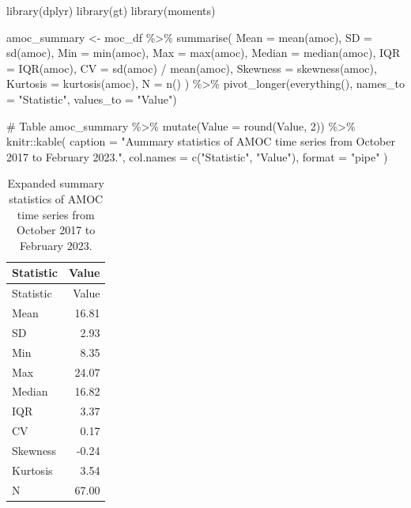 \documentclass[
  11pt,
]{article}
\newenvironment{Shaded}{\begin{snugshade}}{\end{snugshade}}
\newcommand{\AttributeTok}[1]{\textcolor[rgb]{0.40,0.45,0.13}{#1}}
\newcommand{\CommentTok}[1]{\textcolor[rgb]{0.37,0.37,0.37}{#1}}
\newcommand{\DecValTok}[1]{\textcolor[rgb]{0.68,0.00,0.00}{#1}}
\newcommand{\FunctionTok}[1]{\textcolor[rgb]{0.28,0.35,0.67}{#1}}
\newcommand{\NormalTok}[1]{\textcolor[rgb]{0.00,0.23,0.31}{#1}}
\newcommand{\OtherTok}[1]{\textcolor[rgb]{0.00,0.23,0.31}{#1}}
\newcommand{\SpecialCharTok}[1]{\textcolor[rgb]{0.37,0.37,0.37}{#1}}
\newcommand{\StringTok}[1]{\textcolor[rgb]{0.13,0.47,0.30}{#1}}
\begin{document}
\begin{Shaded}
\begin{Highlighting}[]
\FunctionTok{library}\NormalTok{(dplyr)}
\FunctionTok{library}\NormalTok{(gt)}
\FunctionTok{library}\NormalTok{(moments)}

\NormalTok{amoc\_summary }\OtherTok{\textless{}{-}}\NormalTok{ moc\_df }\SpecialCharTok{\%\textgreater{}\%}
  \FunctionTok{summarise}\NormalTok{(}
    \AttributeTok{Mean =} \FunctionTok{mean}\NormalTok{(amoc),}
    \AttributeTok{SD =} \FunctionTok{sd}\NormalTok{(amoc),}
    \AttributeTok{Min =} \FunctionTok{min}\NormalTok{(amoc),}
    \AttributeTok{Max =} \FunctionTok{max}\NormalTok{(amoc),}
    \AttributeTok{Median =} \FunctionTok{median}\NormalTok{(amoc),}
    \AttributeTok{IQR =} \FunctionTok{IQR}\NormalTok{(amoc),}
    \AttributeTok{CV =} \FunctionTok{sd}\NormalTok{(amoc) }\SpecialCharTok{/} \FunctionTok{mean}\NormalTok{(amoc),}
    \AttributeTok{Skewness =} \FunctionTok{skewness}\NormalTok{(amoc),}
    \AttributeTok{Kurtosis =} \FunctionTok{kurtosis}\NormalTok{(amoc),}
    \AttributeTok{N =} \FunctionTok{n}\NormalTok{()}
\NormalTok{  ) }\SpecialCharTok{\%\textgreater{}\%}
  \FunctionTok{pivot\_longer}\NormalTok{(}\FunctionTok{everything}\NormalTok{(), }\AttributeTok{names\_to =} \StringTok{"Statistic"}\NormalTok{, }\AttributeTok{values\_to =} \StringTok{"Value"}\NormalTok{)}

\CommentTok{\# Table}
\NormalTok{amoc\_summary }\SpecialCharTok{\%\textgreater{}\%}
  \FunctionTok{mutate}\NormalTok{(}\AttributeTok{Value =} \FunctionTok{round}\NormalTok{(Value, }\DecValTok{2}\NormalTok{)) }\SpecialCharTok{\%\textgreater{}\%}
\NormalTok{  knitr}\SpecialCharTok{::}\FunctionTok{kable}\NormalTok{(}
    \AttributeTok{caption =} \StringTok{"Aummary statistics of AMOC time series from October 2017 to February 2023."}\NormalTok{,}
    \AttributeTok{col.names =} \FunctionTok{c}\NormalTok{(}\StringTok{"Statistic"}\NormalTok{, }\StringTok{"Value"}\NormalTok{),}
    \AttributeTok{format =} \StringTok{"pipe"}
\NormalTok{  )}
\end{Highlighting}
\end{Shaded}

\begin{longtable}[]{@{}lr@{}}
\caption{Expanded summary statistics of AMOC time series from October
2017 to February 2023.}\tabularnewline
\toprule\noalign{}
Statistic & Value \\
\midrule\noalign{}
\endfirsthead
\toprule\noalign{}
Statistic & Value \\
\midrule\noalign{}
\endhead
\bottomrule\noalign{}
\endlastfoot
Mean & 16.81 \\
SD & 2.93 \\
Min & 8.35 \\
Max & 24.07 \\
Median & 16.82 \\
IQR & 3.37 \\
CV & 0.17 \\
Skewness & -0.24 \\
Kurtosis & 3.54 \\
N & 67.00 \\
\end{longtable}
\end{document}
